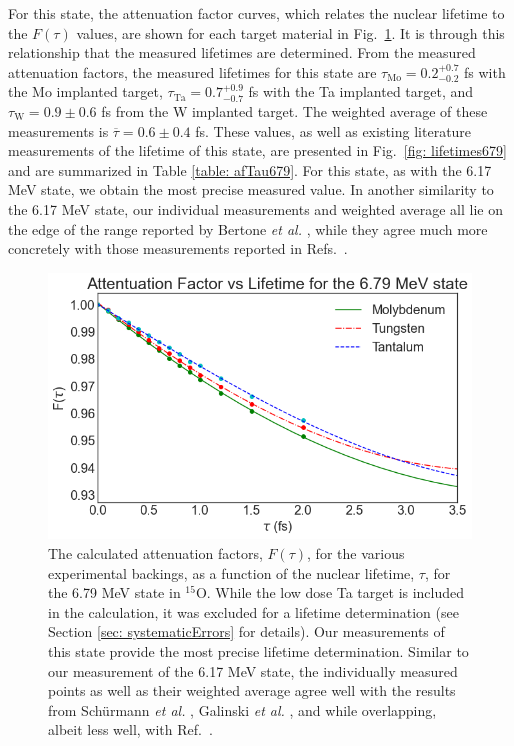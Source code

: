 For this state, the attenuation factor curves, which relates the nuclear lifetime to the $F(\tau)$ values, are shown for each target material in Fig.\ \ref{fig: attFacs679}. It is through this relationship that the measured lifetimes are determined. From the measured attenuation factors, the measured lifetimes for this state are $\tau_{\text{Mo}} = 0.2^{+0.7}_{-0.2}$ fs with the Mo implanted target, $\tau_{\text{Ta}} = 0.7^{+0.9}_{-0.7}$ fs with the Ta implanted target, and $\tau_{\text{W}} = 0.9 \pm 0.6$ fs from the W implanted target. The weighted average of these measurements is $\overline{\tau} = 0.6 \pm 0.4$ fs. These values, as well as existing literature measurements of the lifetime of this state, are presented in Fig.\ \ref{fig: lifetimes679} and are summarized in Table \ref{table: afTau679}. For this state, as with the 6.17 MeV state, we obtain the most precise measured value. In another similarity to the 6.17 MeV state, our individual measurements and weighted average all lie on the edge of the range reported by Bertone \textit{et al.} \cite{Bertone2001}, while they agree much more concretely with those measurements reported in Refs.\ \cite{Schurmann2008, Galinski2014, Michelagnoli2013, Sharma2020}. 


\begin{figure}
\centering
\includegraphics[width=\linewidth]{figures/attFac679.png}
\caption{The calculated attenuation factors, $F(\tau)$, for the various experimental backings, as a function of the nuclear lifetime, $\tau$, for the 6.79 MeV state in $^{15}$O. While the low dose Ta target is included in the calculation, it was excluded for a lifetime determination (see Section \ref{sec: systematicErrors} for details). Our measurements of this state provide the most precise lifetime determination. Similar to our measurement of the 6.17 MeV state, the individually measured points as well as their weighted average agree well with the results from Sch{\"u}rmann \textit{et al.} \cite{Schurmann2008}, Galinski \textit{et al.} \cite{Galinski2014}, and \citet{Sharma2020} while overlapping, albeit less well, with Ref.\ \cite{Bertone2001}.}
\label{fig: attFacs679}
\end{figure}



